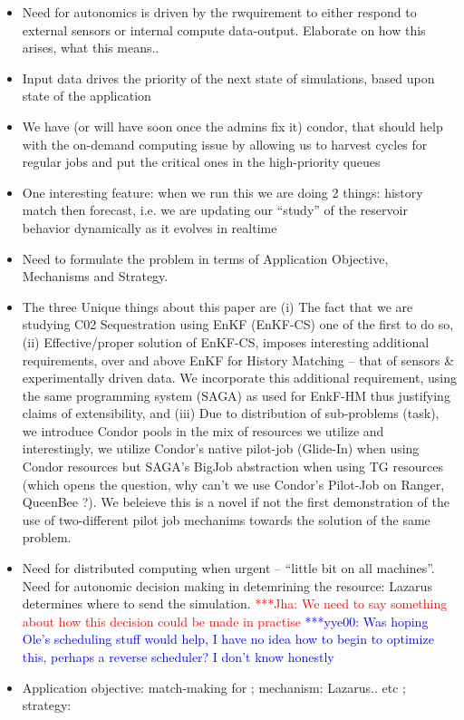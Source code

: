 \documentclass[conference,draft]{IEEEtran}
\newcommand{\jhanote}[1]{ {\textcolor{red} { ***Jha: #1 }}}
\newcommand{\yyenote}[1]{ {\textcolor{blue} { ***yye00: #1 }}}
\newcommand{\jhanote}[1]{}
\newcommand{\yyenote}[1]{}
\begin{document}
\begin{itemize}
\item Need for autonomics is driven by the rwquirement to either respond to external sensors or internal 
compute data-output. Elaborate on how this arises, what this means..
\item Input data drives the priority of the next state of simulations, based upon state of the application

\item We have (or will have soon once the admins fix it) condor, that should help with the on-demand computing issue by allowing us to harvest cycles for regular jobs and put the critical ones in the high-priority queues
\item One interesting feature: when we run this we are doing 2 things: history match then forecast, i.e. we are updating our ``study'' of the reservoir behavior dynamically as it evolves in realtime

\item Need to formulate the problem in terms of Application Objective, Mechanisms and Strategy.

\item The three Unique things about this paper are (i) The fact that we are studying C02 Sequestration using EnKF (EnKF-CS) one of the first to do so, (ii) Effective/proper solution of EnKF-CS, imposes interesting additional requirements, over and above EnKF for History Matching -- that of sensors \& experimentally driven data. We incorporate this additional requirement, using the same programming system (SAGA) as used for EnkF-HM thus justifying claims of extensibility, and (iii) Due to distribution of sub-problems (task), we introduce Condor pools in the mix of resources we utilize and interestingly, we utilize Condor's native pilot-job (Glide-In) when using Condor resources but SAGA's BigJob abstraction when using TG resources (which opens the question, why can't we use Condor's Pilot-Job on Ranger, QueenBee ?). We beleieve this is a novel if not the first demonstration of the use of two-different pilot job mechanims towards the solution of the same problem.

\item Need for distributed computing when urgent -- ``little bit on all machines''. Need for autonomic decision making in detemrining the resource: Lazarus determines where to send the simulation. \jhanote{We need to say something about how this decision could be made in practise} \yyenote{Was hoping Ole's scheduling stuff would help, I have no idea how to begin to optimize this, perhaps a reverse scheduler? I don't know honestly}

\item Application objective: match-making for ; mechanism:  Lazarus.. etc ; strategy: 

\end{itemize}
\end{document}
